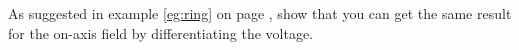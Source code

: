         As suggested in example \ref{eg:ring} on page \pageref{eg:ring},
        show that you can get the same result for the on-axis field
        by differentiating the voltage.
